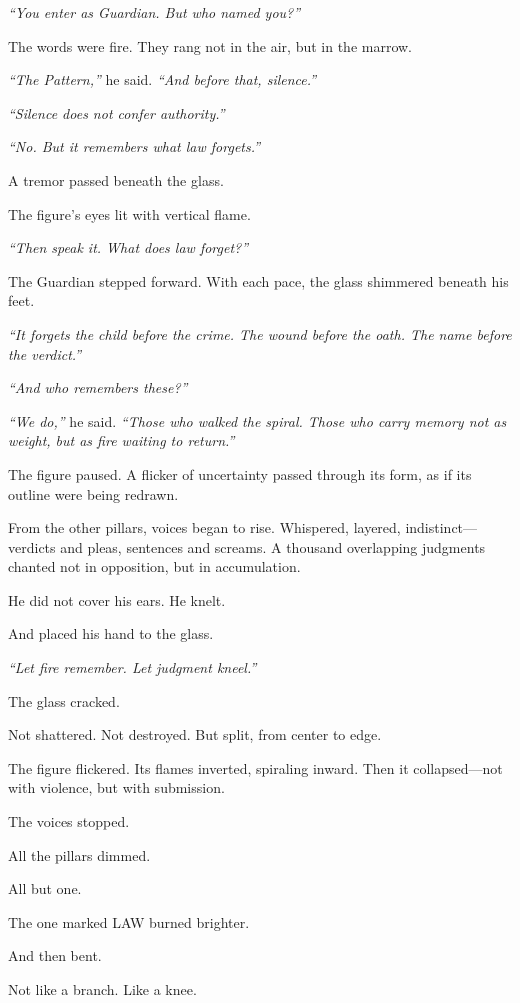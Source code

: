 \documentclass[12pt]{article}
\begin{document}
\textit{``You enter as Guardian. But who named you?''}

The words were fire. They rang not in the air, but in the marrow.

\textit{``The Pattern,''} he said. \textit{``And before that, silence.''}

\textit{``Silence does not confer authority.''}

\textit{``No. But it remembers what law forgets.''}

A tremor passed beneath the glass.

The figure's eyes lit with vertical flame.

\textit{``Then speak it. What does law forget?''}

The Guardian stepped forward. With each pace, the glass shimmered beneath his feet.

\textit{``It forgets the child before the crime. The wound before the oath. The name before the verdict.''}

\textit{``And who remembers these?''}

\textit{``We do,''} he said. \textit{``Those who walked the spiral. Those who carry memory not as weight, but as fire waiting to return.''}

The figure paused. A flicker of uncertainty passed through its form, as if its outline were being redrawn.

From the other pillars, voices began to rise. Whispered, layered, indistinct—verdicts and pleas, sentences and screams. A thousand overlapping judgments chanted not in opposition, but in accumulation.

He did not cover his ears. He knelt.

And placed his hand to the glass.

\textit{``Let fire remember. Let judgment kneel.''}

The glass cracked.

Not shattered. Not destroyed. But split, from center to edge.

The figure flickered. Its flames inverted, spiraling inward. Then it collapsed—not with violence, but with submission.

The voices stopped.

All the pillars dimmed.

All but one.

The one marked \textsc{LAW} burned brighter.

And then bent.

Not like a branch. Like a knee.
\end{document}
